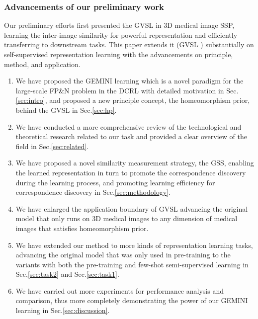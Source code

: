 \subsubsection{Advancements of our preliminary work}\label{sec:adv}
Our preliminary efforts \cite{He_2023_CVPR} first presented the GVSL in 3D medical image SSP, learning the inter-image similarity for powerful representation and efficiently transferring to downstream tasks. This paper extends it (GVSL \cite{He_2023_CVPR}) substantially on self-supervised representation learning with the advancements on principle, method, and application.
\begin{enumerate}[leftmargin=*]
  \item We have proposed the GEMINI learning which is a novel paradigm for the large-scale FP\&N problem in the DCRL with detailed motivation in Sec.\ref{sec:intro}, and proposed a new principle concept, the homeomorphism prior, behind the GVSL in Sec.\ref{sec:hp}.
  \item We have conducted a more comprehensive review of the technological and theoretical research related to our task and provided a clear overview of the field in Sec.\ref{sec:related}.
  \item We have proposed a novel similarity measurement strategy, the GSS, enabling the learned representation in turn to promote the correspondence discovery during the learning process, and promoting learning efficiency for correspondence discovery in Sec.\ref{sec:methodology}.
  \item We have enlarged the application boundary of GVSL advancing the original model that only runs on 3D medical images to any dimension of medical images that satisfies homeomorphism prior.
  \item We have extended our method to more kinds of representation learning tasks, advancing the original model that was only used in pre-training to the variants with both the pre-training and few-shot semi-supervised learning in Sec.\ref{sec:task2} and Sec.\ref{sec:task1}.
  \item We have carried out more experiments for performance analysis and comparison, thus more completely demonstrating the power of our GEMINI learning in Sec.\ref{sec:discussion}.
\end{enumerate}

